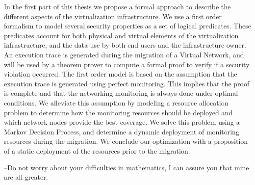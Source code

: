 \documentclass[a4paper, 11pt]{report}
\theoremstyle{definition}
\begin{document}
In the first part of this thesis we propose a formal approach to describe the different aspects of the virtualization infrastructure. We use a first order formalism to model several security properties as a set of logical predicates. These predicates account for both physical and virtual elements of the virtualization infrastructure, and the data use by both end users and the infrastructure owner.
An execution trace is generated during the migration of a Virtual Network, and will be used by a theorem prover to compute a formal proof to verify if a security violation occurred. The first order model is based on the assumption that the execution trace is generated using perfect monitoring. This implies that the proof is complete and that the networking monitoring is always done under optimal conditions.
We alleviate this assumption by modeling a resource allocation problem to determine how the monitoring resources should be deployed and which network nodes provide the best coverage. We solve this problem using a Markov Decision Process, and determine a dynamic deployment of monitoring resources during the migration. We conclude our optimization with a proposition of a static deployment of the resources prior to the migration.

\setcounter{page}{2}
\begin{savequote}
--Do not worry about your difficulties in mathematics, I can assure you that mine are all greater.
\end{savequote}
\end{document}
